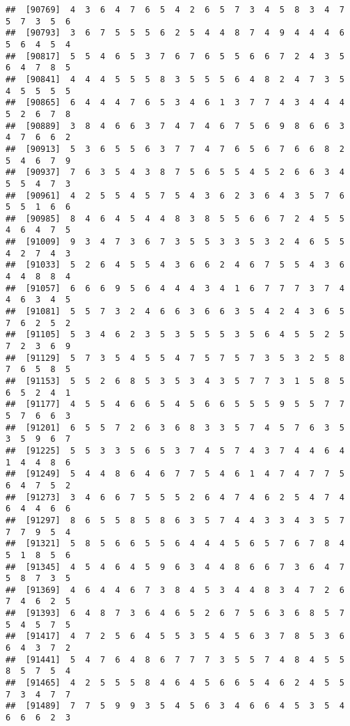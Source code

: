 \documentclass[
]{book}
\begin{document}
\begin{verbatim}
##  [90769]  4  3  6  4  7  6  5  4  2  6  5  7  3  4  5  8  3  4  7  5  7  3  5  6
##  [90793]  3  6  7  5  5  5  6  2  5  4  4  8  7  4  9  4  4  4  6  5  6  4  5  4
##  [90817]  5  5  4  6  5  3  7  6  7  6  5  5  6  6  7  2  4  3  5  6  4  7  8  5
##  [90841]  4  4  4  5  5  5  8  3  5  5  5  6  4  8  2  4  7  3  5  4  5  5  5  5
##  [90865]  6  4  4  4  7  6  5  3  4  6  1  3  7  7  4  3  4  4  4  5  2  6  7  8
##  [90889]  3  8  4  6  6  3  7  4  7  4  6  7  5  6  9  8  6  6  3  4  7  6  6  2
##  [90913]  5  3  6  5  5  6  3  7  7  4  7  6  5  6  7  6  6  8  2  5  4  6  7  9
##  [90937]  7  6  3  5  4  3  8  7  5  6  5  5  4  5  2  6  6  3  4  5  5  4  7  3
##  [90961]  4  2  5  5  4  5  7  5  4  3  6  2  3  6  4  3  5  7  6  5  5  1  6  6
##  [90985]  8  4  6  4  5  4  4  8  3  8  5  5  6  6  7  2  4  5  5  4  6  4  7  5
##  [91009]  9  3  4  7  3  6  7  3  5  5  3  3  5  3  2  4  6  5  5  4  2  7  4  3
##  [91033]  5  2  6  4  5  5  4  3  6  6  2  4  6  7  5  5  4  3  6  4  4  8  8  4
##  [91057]  6  6  6  9  5  6  4  4  4  3  4  1  6  7  7  7  3  7  4  4  6  3  4  5
##  [91081]  5  5  7  3  2  4  6  6  3  6  6  3  5  4  2  4  3  6  5  7  6  2  5  2
##  [91105]  5  3  4  6  2  3  5  3  5  5  5  3  5  6  4  5  5  2  5  7  2  3  6  9
##  [91129]  5  7  3  5  4  5  5  4  7  5  7  5  7  3  5  3  2  5  8  7  6  5  8  5
##  [91153]  5  5  2  6  8  5  3  5  3  4  3  5  7  7  3  1  5  8  5  6  5  2  4  1
##  [91177]  4  5  5  4  6  6  5  4  5  6  6  5  5  5  9  5  5  7  7  5  7  6  6  3
##  [91201]  6  5  5  7  2  6  3  6  8  3  3  5  7  4  5  7  6  3  5  3  5  9  6  7
##  [91225]  5  5  3  3  5  6  5  3  7  4  5  7  4  3  7  4  4  6  4  1  4  4  8  6
##  [91249]  5  4  4  8  6  4  6  7  7  5  4  6  1  4  7  4  7  7  5  6  4  7  5  2
##  [91273]  3  4  6  6  7  5  5  5  2  6  4  7  4  6  2  5  4  7  4  6  4  4  6  6
##  [91297]  8  6  5  5  8  5  8  6  3  5  7  4  4  3  3  4  3  5  7  7  7  9  5  4
##  [91321]  5  8  5  6  6  5  5  6  4  4  4  5  6  5  7  6  7  8  4  5  1  8  5  6
##  [91345]  4  5  4  6  4  5  9  6  3  4  4  8  6  6  7  3  6  4  7  5  8  7  3  5
##  [91369]  4  6  4  4  6  7  3  8  4  5  3  4  4  8  3  4  7  2  6  7  4  6  2  5
##  [91393]  6  4  8  7  3  6  4  6  5  2  6  7  5  6  3  6  8  5  7  5  4  5  7  5
##  [91417]  4  7  2  5  6  4  5  5  3  5  4  5  6  3  7  8  5  3  6  6  4  3  7  2
##  [91441]  5  4  7  6  4  8  6  7  7  7  3  5  5  7  4  8  4  5  5  8  5  7  5  4
##  [91465]  4  2  5  5  5  8  4  6  4  5  6  6  5  4  6  2  4  5  5  7  3  4  7  7
##  [91489]  7  7  5  9  9  3  5  4  5  6  3  4  6  6  4  5  3  5  4  6  6  6  2  3

\end{verbatim}
\end{document}
